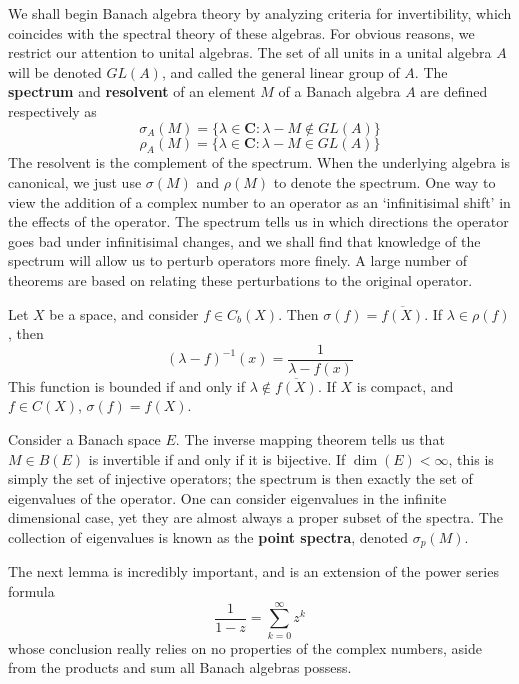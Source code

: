 We shall begin Banach algebra theory by analyzing criteria for invertibility, which coincides with the spectral theory of these algebras. For obvious reasons, we restrict our attention to unital algebras. The set of all units in a unital algebra $A$ will be denoted $GL(A)$, and called the general linear group of $A$. The {\bf spectrum} and {\bf resolvent} of an element $M$ of a Banach algebra $A$ are defined respectively as
%
\[ \sigma_{A}(M) = \{ \lambda \in \mathbf{C} : \lambda - M \not \in GL(A) \} \]
%
\[ \rho_{A}(M) = \{ \lambda \in \mathbf{C} : \lambda - M \in GL(A) \} \]
%
The resolvent is the complement of the spectrum. When the underlying algebra is canonical, we just use $\sigma(M)$ and $\rho(M)$ to denote the spectrum. One way to view the addition of a complex number to an operator as an `infinitisimal shift' in the effects of the operator. The spectrum tells us in which directions the operator goes bad under infinitisimal changes, and we shall find that knowledge of the spectrum will allow us to perturb operators more finely. A large number of theorems are based on relating these perturbations to the original operator.

\begin{example}
    Let $X$ be a space, and consider $f \in C_b(X)$. Then $\sigma(f) = \overline{f(X)}$. If $\lambda \in \rho(f)$, then
    \[ (\lambda - f)^{-1}(x) = \frac{1}{\lambda - f(x)} \]
    This function is bounded if and only if $\lambda \not \in \overline{f(X)}$. If $X$ is compact, and $f \in C(X)$, $\sigma(f) = f(X)$.
\end{example}

\begin{example}
    Consider a Banach space $E$. The inverse mapping theorem tells us that $M \in B(E)$ is invertible if and only if it is bijective. If $\dim(E) < \infty$, this is simply the set of injective operators; the spectrum is then exactly the set of eigenvalues of the operator. One can consider eigenvalues in the infinite dimensional case, yet they are almost always a proper subset of the spectra. The collection of eigenvalues is known as the {\bf point spectra}, denoted $\sigma_p(M)$.
\end{example}

The next lemma is incredibly important, and is an extension of the power series formula
%
\[ \frac{1}{1 - z} = \sum_{k = 0}^\infty z^k \]
%
whose conclusion really relies on no properties of the complex numbers, aside from the products and sum all Banach algebras possess.

